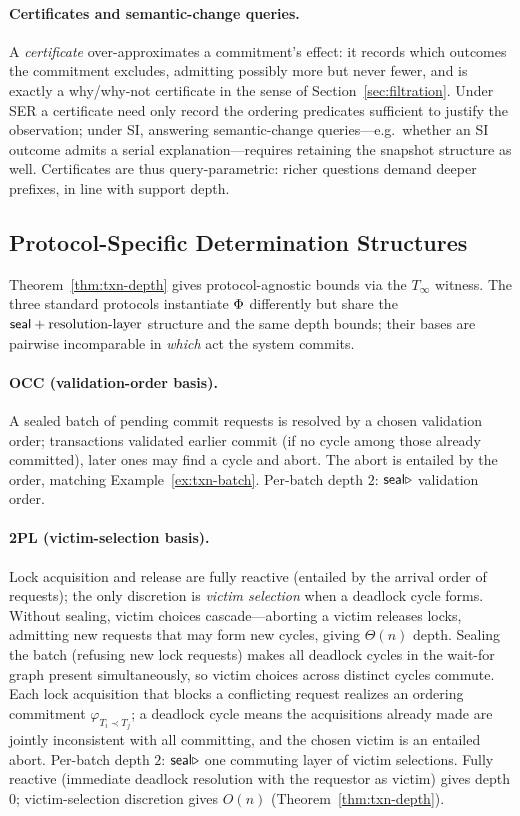 \paragraph{Certificates and semantic-change queries.}
A \emph{certificate} over-approximates a commitment's effect: it records which
outcomes the commitment excludes, admitting possibly more but never fewer, and
is exactly a why/why-not certificate in the sense of
Section~\ref{sec:filtration}. Under SER a certificate need only record the
ordering predicates sufficient to justify the observation; under SI, answering
semantic-change queries---e.g.\ whether an SI outcome admits a serial
explanation---requires retaining the snapshot structure as well. Certificates
are thus query-parametric: richer questions demand deeper prefixes, in line with
support depth.

\subsection{Protocol-Specific Determination Structures}
\label{sec:txn-protocols}

Theorem~\ref{thm:txn-depth} gives protocol-agnostic bounds via the $T_\infty$
witness. The three standard protocols instantiate $\Phi$ differently but share
the $\mathsf{seal} + \text{resolution-layer}$ structure and the same depth bounds; their
bases are pairwise incomparable in \emph{which} act the system commits.

\paragraph{OCC (validation-order basis).}
A sealed batch of pending commit requests is resolved by a chosen validation
order; transactions validated earlier commit (if no cycle among those already
committed), later ones may find a cycle and abort. The abort is entailed by the
order, matching Example~\ref{ex:txn-batch}. Per-batch depth $2$: $\mathsf{seal} \mathbin{\triangleright}$
validation order.

\paragraph{2PL (victim-selection basis).}
Lock acquisition and release are fully reactive (entailed by the arrival order
of requests); the only discretion is \emph{victim selection} when a deadlock
cycle forms. Without sealing, victim choices cascade---aborting a victim
releases locks, admitting new requests that may form new cycles, giving
$\Theta(n)$ depth. Sealing the batch (refusing new lock requests) makes all
deadlock cycles in the wait-for graph present simultaneously, so victim choices
across distinct cycles commute. Each lock acquisition that blocks a conflicting
request realizes an ordering commitment $\varphi_{T_i \prec T_j}$; a deadlock
cycle means the acquisitions already made are jointly inconsistent with all
committing, and the chosen victim is an entailed abort. Per-batch depth $2$:
$\mathsf{seal} \mathbin{\triangleright}$ one commuting layer of victim selections. Fully reactive (immediate
deadlock resolution with the requestor as victim) gives depth $0$;
victim-selection discretion gives $O(n)$ (Theorem~\ref{thm:txn-depth}).

